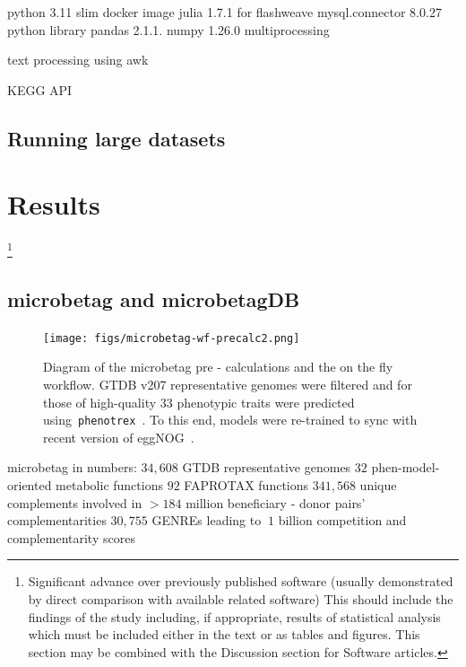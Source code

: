 \documentclass[sn-mathphys,Numbered]{sn-jnl}%
\theoremstyle{thmstyleone}%
\theoremstyle{thmstyletwo}%
\theoremstyle{thmstylethree}%
\begin{document}
        python 3.11 slim docker image 
        julia 1.7.1 for flashweave 
        mysql.connector 8.0.27 python library
        pandas 2.1.1.
        numpy 1.26.0
        multiprocessing

        text processing using awk 

        KEGG API




    \subsection{Running large datasets}






\section{Results}
    \label{sec:results}
    \footnote{
        Significant advance over previously published software (usually demonstrated by direct comparison with available related software)
        This should include the findings of the study including, if appropriate, results of statistical analysis which must be included either in the text or as tables and figures. 
        This section may be combined with the Discussion section for Software articles.
    }

    \subsection*{microbetag and microbetagDB}
        \label{subsec:microbetagdb}


        \begin{figure}[H]
            \label{fig:wf}
            \caption{
                Diagram of the microbetag pre - calculations and the on the fly workflow. 
                GTDB v207 representative genomes were filtered and for those of high-quality
                33 phenotypic traits were predicted using~\texttt{phenotrex}~\cite{feldbauer2015prediction}.
                To this end, models were re-trained to sync with recent version of eggNOG~\cite{huerta2019eggnog}.
            }
            \texttt{[image: figs/microbetag-wf-precalc2.png]}
        \end{figure}


        microbetag in numbers:
        $34,608$ GTDB representative genomes
        $32$ phen-model-oriented metabolic functions 
        $92$ FAPROTAX functions
        $341,568$ unique complements involved in $>184$ million beneficiary - donor pairs' complementarities
        $30,755$ GENREs leading to $~1$ billion competition and complementarity scores
        
\end{document}
